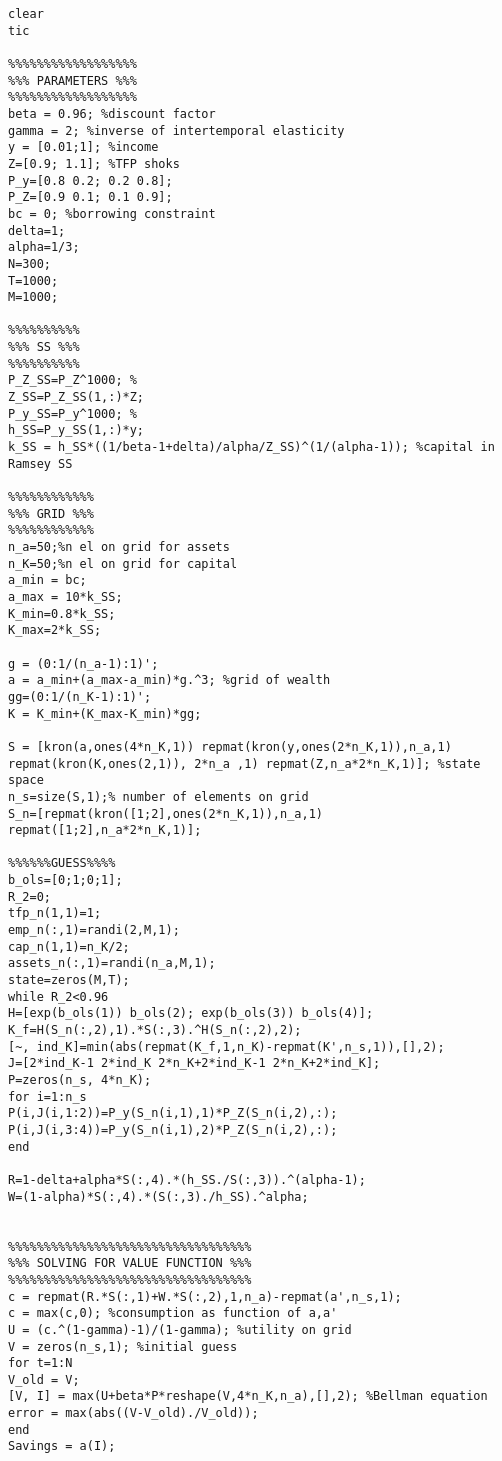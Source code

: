 \documentclass[12pt, a4paper]{article}
\begin{document}





\begin{verbatim}
clear
tic

%%%%%%%%%%%%%%%%%%
%%% PARAMETERS %%%
%%%%%%%%%%%%%%%%%%
beta = 0.96; %discount factor
gamma = 2; %inverse of intertemporal elasticity
y = [0.01;1]; %income
Z=[0.9; 1.1]; %TFP shoks
P_y=[0.8 0.2; 0.2 0.8];
P_Z=[0.9 0.1; 0.1 0.9];
bc = 0; %borrowing constraint
delta=1;
alpha=1/3;
N=300;
T=1000;
M=1000;

%%%%%%%%%%
%%% SS %%%
%%%%%%%%%%
P_Z_SS=P_Z^1000; %
Z_SS=P_Z_SS(1,:)*Z;
P_y_SS=P_y^1000; %
h_SS=P_y_SS(1,:)*y;
k_SS = h_SS*((1/beta-1+delta)/alpha/Z_SS)^(1/(alpha-1)); %capital in Ramsey SS

%%%%%%%%%%%%
%%% GRID %%%
%%%%%%%%%%%%
n_a=50;%n el on grid for assets
n_K=50;%n el on grid for capital
a_min = bc;
a_max = 10*k_SS;
K_min=0.8*k_SS;
K_max=2*k_SS;

g = (0:1/(n_a-1):1)';
a = a_min+(a_max-a_min)*g.^3; %grid of wealth
gg=(0:1/(n_K-1):1)';
K = K_min+(K_max-K_min)*gg;

S = [kron(a,ones(4*n_K,1)) repmat(kron(y,ones(2*n_K,1)),n_a,1) repmat(kron(K,ones(2,1)), 2*n_a ,1) repmat(Z,n_a*2*n_K,1)]; %state space
n_s=size(S,1);% number of elements on grid
S_n=[repmat(kron([1;2],ones(2*n_K,1)),n_a,1) repmat([1;2],n_a*2*n_K,1)];

%%%%%%GUESS%%%%
b_ols=[0;1;0;1];
R_2=0;
tfp_n(1,1)=1;
emp_n(:,1)=randi(2,M,1);
cap_n(1,1)=n_K/2;
assets_n(:,1)=randi(n_a,M,1);
state=zeros(M,T);
while R_2<0.96
H=[exp(b_ols(1)) b_ols(2); exp(b_ols(3)) b_ols(4)];
K_f=H(S_n(:,2),1).*S(:,3).^H(S_n(:,2),2);
[~, ind_K]=min(abs(repmat(K_f,1,n_K)-repmat(K',n_s,1)),[],2);
J=[2*ind_K-1 2*ind_K 2*n_K+2*ind_K-1 2*n_K+2*ind_K];
P=zeros(n_s, 4*n_K);
for i=1:n_s
P(i,J(i,1:2))=P_y(S_n(i,1),1)*P_Z(S_n(i,2),:);
P(i,J(i,3:4))=P_y(S_n(i,1),2)*P_Z(S_n(i,2),:);
end

R=1-delta+alpha*S(:,4).*(h_SS./S(:,3)).^(alpha-1);
W=(1-alpha)*S(:,4).*(S(:,3)./h_SS).^alpha;


%%%%%%%%%%%%%%%%%%%%%%%%%%%%%%%%%%
%%% SOLVING FOR VALUE FUNCTION %%%
%%%%%%%%%%%%%%%%%%%%%%%%%%%%%%%%%%
c = repmat(R.*S(:,1)+W.*S(:,2),1,n_a)-repmat(a',n_s,1); 
c = max(c,0); %consumption as function of a,a'
U = (c.^(1-gamma)-1)/(1-gamma); %utility on grid
V = zeros(n_s,1); %initial guess
for t=1:N
V_old = V;
[V, I] = max(U+beta*P*reshape(V,4*n_K,n_a),[],2); %Bellman equation
error = max(abs((V-V_old)./V_old)); 
end
Savings = a(I);



\end{verbatim}
\end{document}

